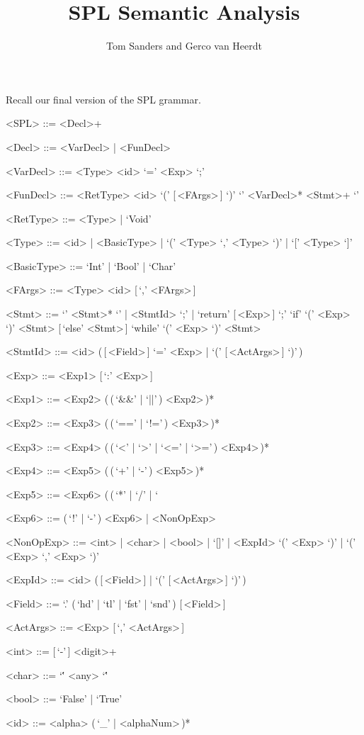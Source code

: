 \documentclass[a4paper]{article}
\title{SPL Semantic Analysis}
\author{Tom Sanders and Gerco van Heerdt}
\begin{document}
\maketitle

Recall our final version of the SPL grammar.
\setlength{\grammarindent}{7.1em}
\begin{grammar}
    <SPL> ::= <Decl>+

    <Decl> ::= <VarDecl> | <FunDecl>

    <VarDecl> ::= <Type> <id> `=' <Exp> `;'

    <FunDecl> ::= <RetType> <id> `(' [\,<FArgs>\,] `)' `{' <VarDecl>* <Stmt>+ `}'

    <RetType> ::= <Type> | `Void'

    <Type> ::= <id> | <BasicType> | `(' <Type> `,' <Type> `)' | `[' <Type> `]'

    <BasicType> ::= `Int' | `Bool' | `Char'

    <FArgs> ::= <Type> <id> [\,`,' <FArgs>\,]

    <Stmt> ::= `{' <Stmt>* `}' | <StmtId> `;' | `return' [\,<Exp>\,] `;'
    \alt `if' `(' <Exp> `)' <Stmt> [\,`else' <Stmt>\,]
    \alt `while' `(' <Exp> `)' <Stmt>

    <StmtId> ::= <id> (\,[\,<Field>\,] `=' <Exp> | `(' [\,<ActArgs>\,] `)'\,)

    <Exp> ::= <Exp1> [\,`:' <Exp>\,]

    <Exp1> ::= <Exp2> (\,(\,`&&' | `||'\,) <Exp2>\,)*

    <Exp2> ::= <Exp3> (\,(\,`==' | `!='\,) <Exp3>\,)*

    <Exp3> ::= <Exp4> (\,(\,`<' | `>' | `<=' | `>='\,) <Exp4>\,)*

    <Exp4> ::= <Exp5> (\,(\,`+' | `-'\,) <Exp5>\,)*

    <Exp5> ::= <Exp6> (\,(\,`*' | `/' | `%

    <Exp6> ::= (\,`!' | `-'\,) <Exp6> | <NonOpExp>

    <NonOpExp> ::= <int> | <char> | <bool> | `[]' | <ExpId>
    \alt `(' <Exp> `)' | `(' <Exp> `,' <Exp> `)'

    <ExpId> ::= <id> (\,[\,<Field>\,] | `(' [\,<ActArgs>\,] `)'\,)

    <Field> ::= `.' (\,`hd' | `tl' | `fst' | `snd'\,) [\,<Field>\,]

    <ActArgs> ::= <Exp> [\,`,' <ActArgs>\,]

    <int> ::= [\,`-'\,] <digit>+

    <char> ::= `\'' <any> `\''

    <bool> ::= `False' | `True'

    <id> ::= <alpha> (\,`_' | <alphaNum>\,)*
\end{grammar}
\end{document}
